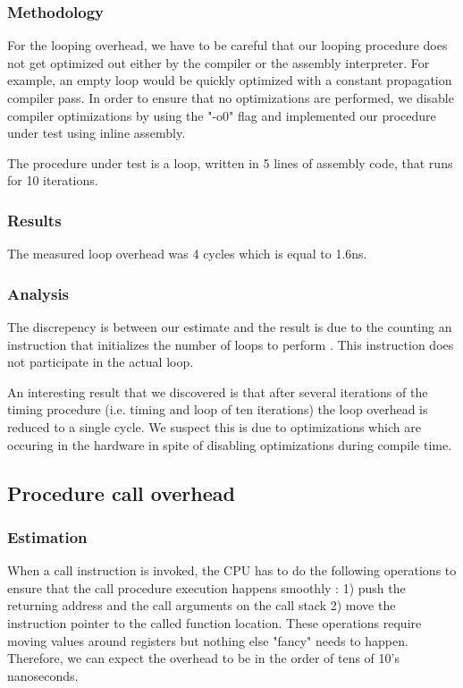 \subsubsection{Methodology}

For the looping overhead,  we have to be careful that our looping procedure does
not get optimized out either by the compiler or the assembly interpreter. For
example, an empty loop would be quickly optimized with a constant propagation
compiler pass.  In order to ensure that no optimizations are performed,  we
disable compiler optimizations by using the "-o0" flag and implemented our
procedure under test using inline assembly.

The procedure under test is a loop, written in 5 lines of assembly code, that
runs for 10 iterations.

\subsubsection{Results}

The measured loop overhead was 4 cycles which is equal to 1.6ns.

\subsubsection{Analysis}

The discrepency is between our estimate and the result is due to the counting
an instruction that initializes the number of loops to perform . This
instruction does not participate in the actual loop.

An interesting result that we discovered is that after several iterations of the
timing procedure (i.e. timing and loop of ten iterations) the loop overhead is
reduced to a single cycle. We suspect this is due to optimizations which are
occuring in the hardware in spite of disabling optimizations during compile
time.

\subsection{Procedure call overhead}

\subsubsection{Estimation}

When a call instruction is invoked, the CPU has to do the following operations to
ensure that the call procedure execution happens smoothly : 1) push the returning
address and the call arguments on the call stack 2) move the instruction pointer to
the called function location. These operations require moving values around registers
but nothing else "fancy" needs to happen. Therefore, we can expect the overhead to
be in the order of tens of 10's nanoseconds.

